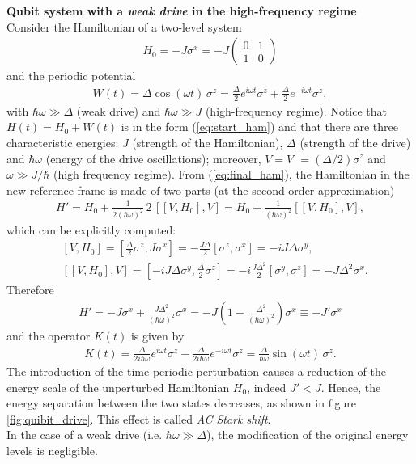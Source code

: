 \begin{tcolorbox}
\textbf{Qubit system with a \textit{weak drive} in the high-frequency regime} \\
Consider the Hamiltonian of a two-level system
\begin{align}
    \label{eq:qubit_H0}
    H_0 = -J \sigma^x = -J \begin{pmatrix} 0 & 1 \\ 1 & 0 \end{pmatrix} 
\end{align}
and the periodic potential
\begin{align}
    \label{eq:qubit_W}
    W(t) = \Delta \cos{(\omega t)} \, \sigma^z = \frac{\Delta}{2} e^{i \omega t} \sigma^z + \frac{\Delta}{2} e^{-i \omega t} \sigma^z,
\end{align}
with $\hbar \omega \gg \Delta$ (weak drive) and $\hbar \omega \gg J$ (high-frequency regime). Notice that $H(t) = H_0 + W(t)$ is in the form (\ref{eq:start_ham}) and that there are three characteristic energies: $J$ (strength of the Hamiltonian), $\Delta$ (strength of the drive) and $\hbar \omega$ (energy of the drive oscillations); moreover, $V = V^\dagger = (\Delta/2) \sigma^z$ and $\omega \gg J/\hbar$ (high frequency regime). 
From (\ref{eq:final_ham}), the Hamiltonian in the new reference frame is made of two parts (at the second order approximation)
\begin{align*}
    H'= H_0 + \frac{1}{2 (\hbar \omega)^2} \, 2 \, [[V,H_0],V] = H_0 + \frac{1}{(\hbar \omega)^2}  [[V,H_0],V]  ,
\end{align*}
which can be explicitly computed:
\begin{align*}
    &[V,H_0] = \left[ \frac{\Delta}{2} \sigma^z, J \sigma^x \right] = -\frac{J\Delta}{2} [\sigma^z,\sigma^x] = - i J \Delta \sigma^y, \\
    &[[V,H_0],V] = \left[-i J \Delta \sigma^y, \frac{\Delta}{2} \sigma^z \right] = -i \frac{J \Delta^2}{2} [\sigma^y, \sigma^z] = -J \Delta^2 \sigma^x.
\end{align*}
Therefore
\begin{align*}
    H' = -J \sigma^x + \frac{J \Delta^2}{(\hbar \omega)^2} \sigma^x = -J\left( 1 - \frac{\Delta^2}{(\hbar \omega)^2} \right) \sigma^x \equiv - J'\sigma^x
\end{align*}
and the operator $K(t)$ is given by
\begin{align*}
    K(t) = \frac{\Delta}{2 i \hbar \omega } e^{i \omega t} \sigma^z - \frac{\Delta}{2 i \hbar \omega } e^{-i \omega t} \sigma^z = \frac{\Delta}{\hbar\omega } \sin{(\omega t)} \, \sigma^z.
\end{align*}
The introduction of the time periodic perturbation causes a reduction of the energy scale of the unperturbed Hamiltonian $H_0$, indeed $J'< J$. Hence, the energy separation between the two states decreases, as shown in figure \ref{fig:quibit_drive}. This effect is called \textit{AC Stark shift}.\\ 
In the case of a weak drive (i.e. $\hbar \omega \gg \Delta$), the modification of the original energy levels is negligible. 
\end{tcolorbox}

